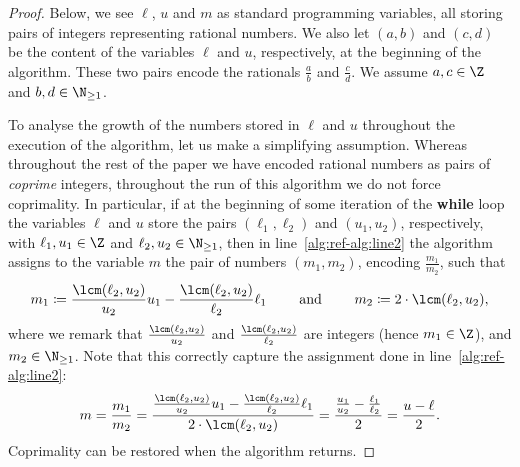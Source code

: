 \begin{proof}
  Below, we see $\ell$, $u$ and $m$ as standard programming variables, all
  storing pairs of integers representing rational numbers.  
  We also let $(a,b)$ and $(c,d)$ be the content of the variables $\ell$ and
  $u$, respectively, at the beginning of the algorithm. These two pairs encode
  the rationals $\frac{a}{b}$ and $\frac{c}{d}$. We assume $a,c \in \Z$ and $b,d
  \in \N_{\geq 1}$.

  To analyse the growth of the numbers stored in $\ell$ and $u$ throughout the
  execution of the algorithm, let us make a simplifying assumption. Whereas
  throughout the rest of the paper we have encoded rational numbers as pairs of
  \emph{coprime} integers, throughout the run of this algorithm we do not force
  coprimality. In particular, if at the beginning of some iteration of the
  \textbf{while} loop the variables $\ell$ and $u$ store the pairs
  $(\ell_1,\ell_2)$ and $(u_1,u_2)$, respectively, with $\ell_1,u_1
  \in \Z$ and $\ell_2,u_2 \in \N_{\geq 1}$, then in line~\ref{alg:ref-alg:line2}
  the algorithm assigns to the variable $m$ the pair of numbers $(m_1,m_2)$,
  encoding $\frac{m_1}{m_2}$, such that 
  \[ 
    m_1 \coloneqq \frac{\lcm(\ell_2,u_2)}{u_2}u_1 - \frac{\lcm(\ell_2,u_2)}{\ell_2}\ell_1 
    \qquad\text{ and }\qquad
    m_2 \coloneqq 2 \cdot \lcm(\ell_2,u_2),
  \]
  where we remark that $\frac{\lcm(\ell_2,u_2)}{u_2}$ and
  $\frac{\lcm(\ell_2,u_2)}{\ell_2}$ are integers (hence $m_1 \in \Z$), and $m_2
  \in \N_{\geq 1}$.
  Note that this correctly capture the assignment done in line~\ref{alg:ref-alg:line2}:
  \[ 
    m = \frac{m_1}{m_2} = \frac{\frac{\lcm(\ell_2,u_2)}{u_2}u_1 - \frac{\lcm(\ell_2,u_2)}{\ell_2}\ell_1}{2 \cdot \lcm(\ell_2,u_2)} 
    = \frac{\frac{u_1}{u_2}-\frac{\ell_1}{\ell_2}}{2} 
    = \frac{u-\ell}{2}.
  \]
  Coprimality can be restored when the algorithm returns. 
  

\end{proof}

